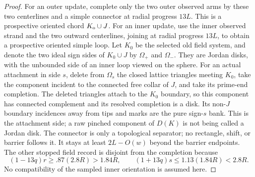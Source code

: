 \begin{proof}
For an outer update, complete only the two outer observed arms by these
two centerlines and a simple connector at radial progress \(13L\).
This is a prospective oriented chord \(K_{\rm o}\cup J\).  For an inner
update, use the inner observed strand and the two outward centerlines,
joining at radial progress \(13L\), to obtain a prospective oriented
simple loop.  Let \(K_0\) be the selected old field system, and denote
the two ideal sign sides of \(K_0\cup J\) by \(\Omega_+\) and
\(\Omega_-\).  They are Jordan disks, with the unbounded side of an
inner loop viewed on the sphere.  For an actual attachment in side \(s\),
delete from \(\Omega_s\) the closed lattice triangles meeting \(K_0\), take the component
incident to the connected free collar of \(J\), and take its prime-end
completion.  The deleted triangles attach to the \(K_0\) boundary, so this
component has connected complement and its resolved completion is a disk.
Its non-\(J\) boundary incidences away from tips and marks are the pure
sign-\(s\) bank.  This is the attachment side; a raw pinched component of
\(D(K)\) is not being called a Jordan disk.  The connector is only a
topological separator; no rectangle,
shift, or barrier follows it.  It stays at least \(2L-O(w)\) beyond the
barrier endpoints.  The other stopped field record is disjoint from the
completion because
\[
  (1-13q)r\ge.87(2.8R)>1.84R,\qquad
  (1+13q)s\le1.13(1.84R)<2.8R.                              \tag{G3e}
\]
No compatibility of the sampled inner orientation is assumed here.


\end{proof}
